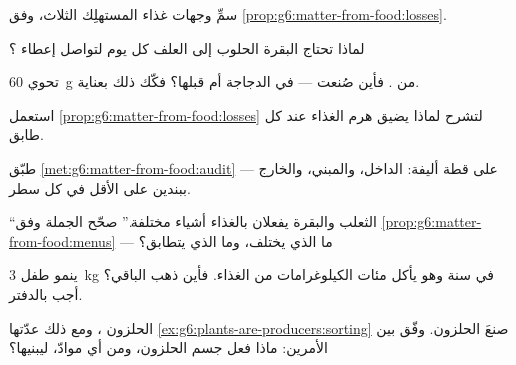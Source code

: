\begin{exercise}[$\star$]\label{exo:g6:matter-from-food:4}
سمِّ وجهات غذاء المستهلِك الثلاث، وفق
\cref{prop:g6:matter-from-food:losses}.
\end{exercise}

\begin{exercise}[$\star$]\label{exo:g6:matter-from-food:5}
لماذا تحتاج البقرة الحلوب إلى العلف كل يوم لتواصل إعطاء ؟
\end{exercise}

\begin{exercise}[$\star$]\label{exo:g6:matter-from-food:6}
تحوي  \qty{60}{g} من . فأين صُنعت --- في
الدجاجة أم قبلها؟ فكّك ذلك بعناية.
\end{exercise}

\begin{exercise}[$\star\star$]\label{exo:g6:matter-from-food:7}
استعمل \cref{prop:g6:matter-from-food:losses} لتشرح لماذا يضيق
هرم الغذاء عند كل طابق.
\end{exercise}

\begin{exercise}[$\star\star$]\label{exo:g6:matter-from-food:8}
طبّق \cref{met:g6:matter-from-food:audit} على قطة أليفة: الداخل،
والمبني، والخارج --- ببندين على الأقل في كل سطر.
\end{exercise}

\begin{exercise}[$\star\star$]\label{exo:g6:matter-from-food:9}
``الثعلب والبقرة يفعلان بالغذاء أشياء مختلفة.'' صحّح الجملة وفق
\cref{prop:g6:matter-from-food:menus} --- ما الذي يختلف، وما الذي
يتطابق؟
\end{exercise}

\begin{exercise}[$\star\star$]\label{exo:g6:matter-from-food:10}
ينمو طفل \qty{3}{kg} في سنة وهو يأكل مئات الكيلوغرامات من
الغذاء. فأين ذهب الباقي؟ أجب بالدفتر.
\end{exercise}

\begin{exercise}[$\star\star$]\label{exo:g6:matter-from-food:11}
 الحلزون ، ومع ذلك عدّتها
\cref{ex:g6:plants-are-producers:sorting} صنعَ الحلزون. وفّق بين
الأمرين: ماذا فعل جسم الحلزون، ومن أي موادّ، ليبنيها؟
\end{exercise}

